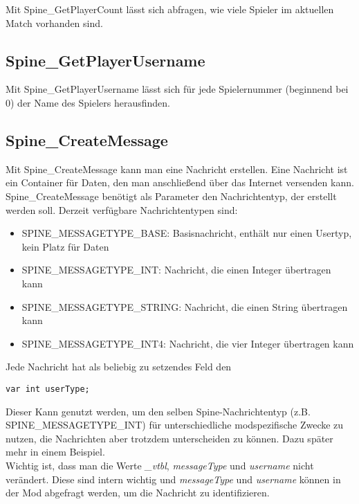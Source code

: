\documentclass{article}
\begin{document}
Mit Spine\_GetPlayerCount lässt sich abfragen, wie viele Spieler im aktuellen Match vorhanden sind.

\subsection{Spine\_GetPlayerUsername}

Mit Spine\_GetPlayerUsername lässt sich für jede Spielernummer (beginnend bei 0) der Name des Spielers herausfinden.

\subsection{Spine\_CreateMessage}

Mit Spine\_CreateMessage kann man eine Nachricht erstellen. Eine Nachricht ist ein Container für Daten, den man anschließend über das Internet versenden kann. Spine\_CreateMessage benötigt als Parameter den Nachrichtentyp, der erstellt werden soll. Derzeit verfügbare Nachrichtentypen sind:

\begin{itemize}
	\item SPINE\_MESSAGETYPE\_BASE: Basisnachricht, enthält nur einen Usertyp, kein Platz für Daten
	\item SPINE\_MESSAGETYPE\_INT: Nachricht, die einen Integer übertragen kann
	\item SPINE\_MESSAGETYPE\_STRING: Nachricht, die einen String übertragen kann
	\item SPINE\_MESSAGETYPE\_INT4: Nachricht, die vier Integer übertragen kann
\end{itemize}

Jede Nachricht hat als beliebig zu setzendes Feld den

\begin{lstlisting}
var int userType;
\end{lstlisting}

Dieser Kann genutzt werden, um den selben Spine-Nachrichtentyp (z.B. SPINE\_MESSAGETYPE\_INT) für unterschiedliche modspezifische Zwecke zu nutzen, die Nachrichten aber trotzdem unterscheiden zu können. Dazu später mehr in einem Beispiel.\\

Wichtig ist, dass man die Werte \textit{\_vtbl}, \textit{messageType} und \textit{username} nicht verändert. Diese sind intern wichtig und \textit{messageType} und \textit{username} können in der Mod abgefragt werden, um die Nachricht zu identifizieren.\\
\end{document}
